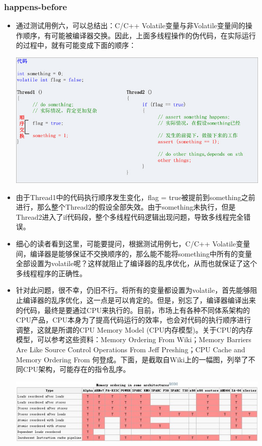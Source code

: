 \documentclass[9pt,b5paper]{article}
\begin{document}
\subsubsection{happens-before}
\label{sec-9-3-4}
\begin{itemize}
\item 通过测试用例六，可以总结出：C/C++ Volatile变量与非Volatile变量间的操作顺序，有可能被编译器交换。因此，上面多线程操作的伪代码，在实际运行的过程中，就有可能变成下面的顺序：

\includegraphics[width=.9\linewidth]{../pic/v9.jpg}

\item 由于Thread1中的代码执行顺序发生变化，flag = true被提前到something之前进行，那么整个Thread2的假设全部失效。由于something未执行，但是Thread2进入了if代码段，整个多线程代码逻辑出现问题，导致多线程完全错误。
\item 细心的读者看到这里，可能要提问，根据测试用例七，C/C++ Volatile变量间，编译器是能够保证不交换顺序的，那么能不能将something中所有的变量全部设置为volatile呢？这样就阻止了编译器的乱序优化，从而也就保证了这个多线程程序的正确性。
\item 针对此问题，很不幸，仍旧不行。将所有的变量都设置为volatile，首先能够阻止编译器的乱序优化，这一点是可以肯定的。但是，别忘了，编译器编译出来的代码，最终是要通过CPU来执行的。目前，市场上有各种不同体系架构的CPU产品，CPU本身为了提高代码运行的效率，也会对代码的执行顺序进行调整，这就是所谓的CPU Memory Model (CPU内存模型)。关于CPU的内存模型，可以参考这些资料：Memory Ordering From Wiki；Memory Barriers Are Like Source Control Operations From Jeff Preshing；CPU Cache and Memory Ordering From 何登成。下面，是截取自Wiki上的一幅图，列举了不同CPU架构，可能存在的指令乱序。

\includegraphics[width=.9\linewidth]{../pic/v10.jpg}


\end{itemize}
\end{document}
